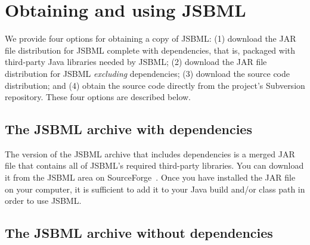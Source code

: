 
\section{Obtaining and using JSBML}
\label{sec:obtaining-jsbml}

We provide four options for obtaining a copy of JSBML: (1) download the JAR
file distribution for JSBML complete with dependencies, that is, packaged
with third-party Java libraries needed by JSBML; (2) download the JAR file
distribution for JSBML \emph{excluding} dependencies; (3) download the
source code distribution; and (4) obtain the source code directly from the
project's Subversion repository. These four options are described below.


\subsection{The JSBML archive with dependencies}

The version of the JSBML archive that includes dependencies is a merged JAR
file that contains all of JSBML's required third-party libraries. You can
download it from the JSBML area on SourceForge~\cite{JSBMLdownload}. Once
you have installed the JAR file on your computer, it is sufficient to add
it to your Java build and/or class path in order to use JSBML.


\subsection{The JSBML archive without dependencies}

